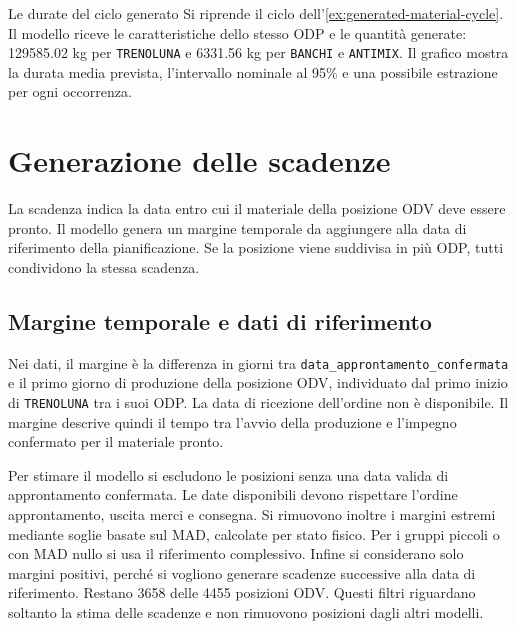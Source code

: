 \begingroup
{}
\begin{examplebox}{Le durate del ciclo generato}
Si riprende il ciclo dell'\cref{ex:generated-material-cycle}. Il modello riceve le caratteristiche dello stesso ODP e le quantità generate: \num{129585.02} kg per \texttt{TRENOLUNA} e \num{6331.56} kg per \texttt{BANCHI} e \texttt{ANTIMIX}. Il grafico mostra la durata media prevista, l'intervallo nominale al 95\% e una possibile estrazione per ogni occorrenza.

\begin{center}
\end{center}

\end{examplebox}
\endgroup

\section{Generazione delle scadenze}
\label{sec:deadline-generation}

La scadenza indica la data entro cui il materiale della posizione ODV deve essere pronto. Il modello genera un margine temporale da aggiungere alla data di riferimento della pianificazione. Se la posizione viene suddivisa in più ODP, tutti condividono la stessa scadenza.

\subsection{Margine temporale e dati di riferimento}
\label{sec:readiness-margin-data}

Nei dati, il margine è la differenza in giorni tra \texttt{data\_approntamento\_confermata} e il primo giorno di produzione della posizione ODV, individuato dal primo inizio di \texttt{TRENOLUNA} tra i suoi ODP. La data di ricezione dell'ordine non è disponibile. Il margine descrive quindi il tempo tra l'avvio della produzione e l'impegno confermato per il materiale pronto.

Per stimare il modello si escludono le posizioni senza una data valida di approntamento confermata. Le date disponibili devono rispettare l'ordine approntamento, uscita merci e consegna. Si rimuovono inoltre i margini estremi mediante soglie basate sul MAD, calcolate per stato fisico. Per i gruppi piccoli o con MAD nullo si usa il riferimento complessivo. Infine si considerano solo margini positivi, perché si vogliono generare scadenze successive alla data di riferimento. Restano \num{3658} delle \num{4455} posizioni ODV. Questi filtri riguardano soltanto la stima delle scadenze e non rimuovono posizioni dagli altri modelli.

